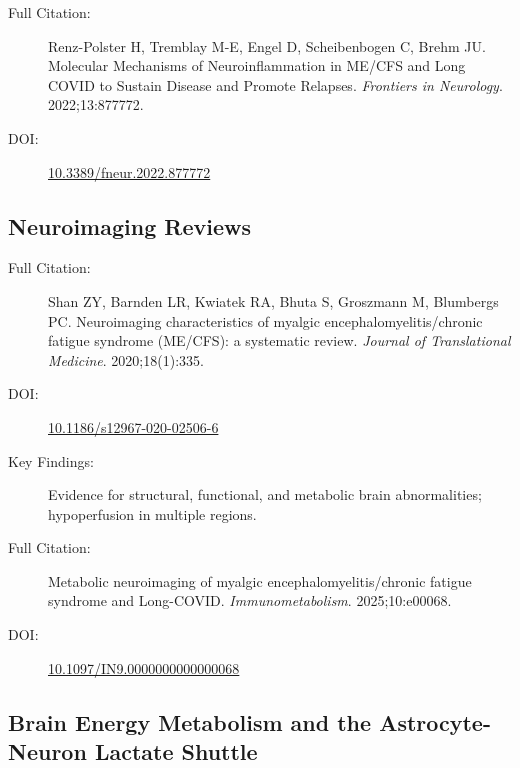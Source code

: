 \begin{description}
    \item[Full Citation:] Renz-Polster H, Tremblay M-E, Engel D, Scheibenbogen C, Brehm JU. Molecular Mechanisms of Neuroinflammation in ME/CFS and Long COVID to Sustain Disease and Promote Relapses. \textit{Frontiers in Neurology}. 2022;13:877772.
    \item[DOI:] \href{https://doi.org/10.3389/fneur.2022.877772}{10.3389/fneur.2022.877772}
\end{description}

\subsection{Neuroimaging Reviews}

\begin{description}
    \item[Full Citation:] Shan ZY, Barnden LR, Kwiatek RA, Bhuta S, Groszmann M, Blumbergs PC. Neuroimaging characteristics of myalgic encephalomyelitis/chronic fatigue syndrome (ME/CFS): a systematic review. \textit{Journal of Translational Medicine}. 2020;18(1):335.
    \item[DOI:] \href{https://doi.org/10.1186/s12967-020-02506-6}{10.1186/s12967-020-02506-6}
    \item[Key Findings:] Evidence for structural, functional, and metabolic brain abnormalities; hypoperfusion in multiple regions.
\end{description}

\begin{description}
    \item[Full Citation:] Metabolic neuroimaging of myalgic encephalomyelitis/chronic fatigue syndrome and Long-COVID. \textit{Immunometabolism}. 2025;10:e00068.
    \item[DOI:] \href{https://doi.org/10.1097/IN9.0000000000000068}{10.1097/IN9.0000000000000068}
\end{description}

\subsection{Brain Energy Metabolism and the Astrocyte-Neuron Lactate Shuttle}

